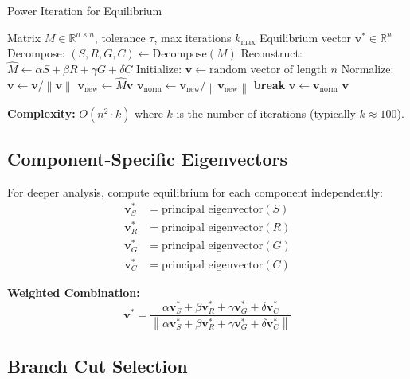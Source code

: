 \documentclass[11pt,a4paper]{article}
\theoremstyle{definition}
\theoremstyle{remark}
\newcommand{\R}{\mathbb{R}}
\newcommand{\norm}[1]{\left\|#1\right\|}
\begin{document}
\begin{algorithm}
\caption{Power Iteration for Equilibrium}\label{alg:power}
\begin{algorithmic}[1]
\Require Matrix $M \in \R^{n \times n}$, tolerance $\tau$, max iterations $k_{\max}$
\Ensure Equilibrium vector $\mathbf{v}^* \in \R^n$
\State Decompose: $(S, R, G, C) \gets \text{Decompose}(M)$
\State Reconstruct: $\hat{M} \gets \alpha S + \beta R + \gamma G + \delta C$
\State Initialize: $\mathbf{v} \gets \text{random vector of length } n$
\State Normalize: $\mathbf{v} \gets \mathbf{v} / \norm{\mathbf{v}}$
  \State $\mathbf{v}_{\text{new}} \gets \hat{M} \mathbf{v}$
  \State $\mathbf{v}_{\text{norm}} \gets \mathbf{v}_{\text{new}} / \norm{\mathbf{v}_{\text{new}}}$
  \If{$\norm{\mathbf{v}_{\text{norm}} - \mathbf{v}} < \tau$}
    \State \textbf{break}
  \EndIf
  \State $\mathbf{v} \gets \mathbf{v}_{\text{norm}}$
\EndFor
\State \Return $\mathbf{v}$
\end{algorithmic}
\end{algorithm}

\textbf{Complexity:} $O(n^2 \cdot k)$ where $k$ is the number of iterations (typically $k \approx 100$).

\subsection{Component-Specific Eigenvectors}

For deeper analysis, compute equilibrium for each component independently:
\begin{align}
\mathbf{v}_S^* &= \text{principal eigenvector}(S) \\
\mathbf{v}_R^* &= \text{principal eigenvector}(R) \\
\mathbf{v}_G^* &= \text{principal eigenvector}(G) \\
\mathbf{v}_C^* &= \text{principal eigenvector}(C)
\end{align}

\textbf{Weighted Combination:}
\begin{equation}
\mathbf{v}^* = \frac{\alpha \mathbf{v}_S^* + \beta \mathbf{v}_R^* + \gamma \mathbf{v}_G^* + \delta \mathbf{v}_C^*}{\norm{\alpha \mathbf{v}_S^* + \beta \mathbf{v}_R^* + \gamma \mathbf{v}_G^* + \delta \mathbf{v}_C^*}}
\end{equation}

\subsection{Branch Cut Selection}
\end{document}
